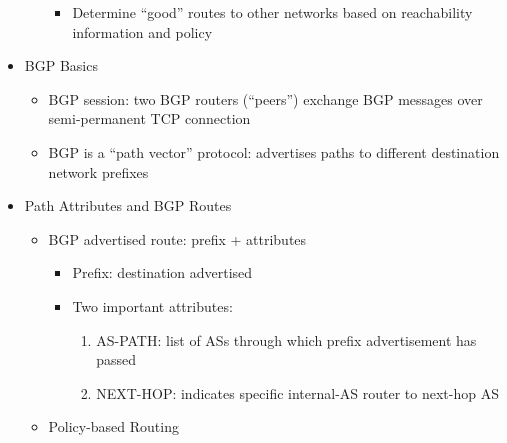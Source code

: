 \begin{itemize}
\begin{itemize}
\begin{itemize}
          \item Determine ``good'' routes to other networks based on reachability information and policy

        \end{itemize}

    \end{itemize}

  \item BGP Basics

    \begin{itemize}

      \item BGP session: two BGP routers (``peers'') exchange BGP messages over semi-permanent TCP connection

      \item BGP is a ``path vector'' protocol: advertises paths to different destination network prefixes

    \end{itemize}

  \item Path Attributes and BGP Routes

    \begin{itemize}

      \item BGP advertised route: prefix + attributes

        \begin{itemize}

          \item Prefix: destination advertised

          \item Two important attributes:

            \begin{enumerate}

              \item AS-PATH: list of ASs through which prefix advertisement has passed

              \item NEXT-HOP: indicates specific internal-AS router to next-hop AS

            \end{enumerate}

        \end{itemize}

      \item Policy-based Routing

        \begin{itemize}


\end{itemize}
\end{itemize}
\end{itemize}
